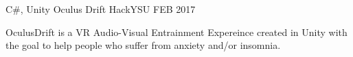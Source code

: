 
\begin{cventries}
	
	\cventry
	{C\#, Unity} %
	{Oculus Drift} %
	{HackYSU} %
	{FEB 2017} %
	{
		\begin{cvitems} %
			\item {OculusDrift is a VR Audio-Visual Entrainment Expereince created in Unity with the goal to help people who suffer from anxiety and/or insomnia.}
		\end{cvitems}
	}
	
\end{cventries}